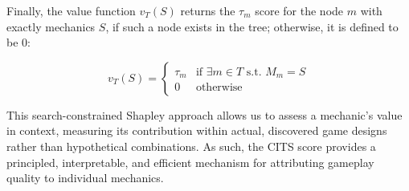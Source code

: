 \documentclass{article} %
\newcommand{\name}{\textsc{Mortar}}
\begin{document}
Finally, the value function $v_T(S)$ returns the $\tau_m$ score for the node $m$ with exactly mechanics $S$, if such a node exists in the tree; otherwise, it is defined to be $0$:

\begin{equation*}
    v_T(S) = \begin{cases}
\tau_m & \text{if } \exists m \in T \text{ s.t. } M_m = S \\
0 & \text{otherwise}
\end{cases}
\end{equation*}

This search-constrained Shapley approach allows us to assess a mechanic's value in context, measuring its contribution within actual, discovered game designs rather than hypothetical combinations. As such, the CITS score provides a principled, interpretable, and efficient mechanism for attributing gameplay quality to individual mechanics.


\end{document}

